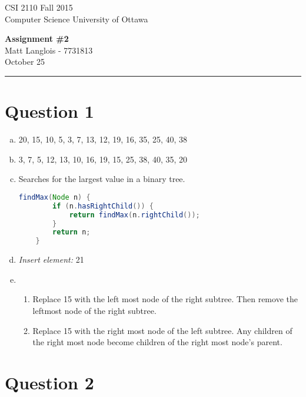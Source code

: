 \documentclass[fleqn, 12pt]{article}
\begin{document}
\noindent
CSI 2110 \hfill Fall 2015\\
Computer Science \hfill University of Ottawa
\begin{center}
{\bf Assignment \#2}\\
Matt Langlois - 7731813\\
October 25\\ \vspace{24pt}
\end{center}

\hrule

\vspace{12pt}

\section*{Question 1}

\begin{enumerate}[a)]
\item 
    20, 15, 10, 5, 3, 7, 13, 12, 19, 16, 35, 25, 40, 38
\item 
    3, 7, 5, 12, 13, 10, 16, 19, 15, 25, 38, 40, 35, 20
\item 
    Searches for the largest value in a binary tree.
    \begin{lstlisting}[language=java, linewidth=4in]
    findMax(Node n) {
        if (n.hasRightChild()) {
            return findMax(n.rightChild());
        }
        return n;
    }
    \end{lstlisting}
\item \emph{Insert element:} 21 \\
\item
    \begin{enumerate}
    \item Replace 15 with the left most node of the right subtree. Then remove the leftmost node of the right subtree.\\
    \item Replace 15 with the right most node of the left subtree. Any children of the right most node become children of the right most node's parent.\\
    \end{enumerate}
\end{enumerate}

\section*{Question 2}
\end{document}
